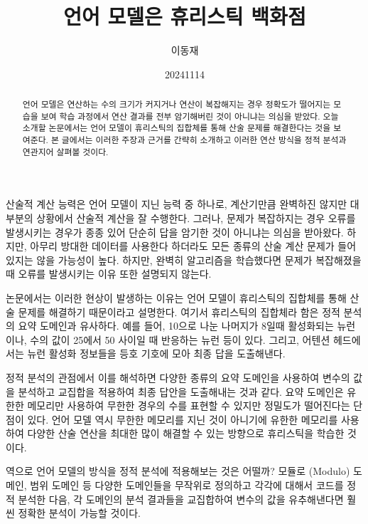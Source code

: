 \documentclass[11pt, oneside]{article}   	%
\title{언어 모델은 휴리스틱 백화점}
\author{이동재}
\date{20241114}
\begin{document}
\maketitle


\begin{abstract}
  언어 모델은 연산하는 수의 크기가 커지거나 연산이 복잡해지는 경우 정확도가 떨어지는 모습을 보여 학습 과정에서 연산 결과를 전부 암기해버린 것이 아니냐는 의심을 받았다. 오늘 소개할 논문에서는 언어 모델이 휴리스틱의 집합체를 통해 산술 문제를 해결한다는 것을 보여준다. 본 글에서는 이러한 주장과 근거를 간략히 소개하고 이러한 연산 방식을 정적 분석과 연관지어 살펴볼 것이다.
\end{abstract}
  산술적 계산 능력은 언어 모델이 지닌 능력 중 하나로, 계산기만큼 완벽하진 않지만 대부분의 상황에서 산술적 계산을 잘 수행한다. 그러나, 문제가 복잡하지는 경우 오류를 발생시키는 경우가 종종 있어 단순히 답을 암기한 것이 아니냐는 의심을 받아왔다. 하지만, 아무리 방대한 데이터를 사용한다 하더라도 모든 종류의 산술 계산 문제가 들어있지는 않을 가능성이 높다. 하지만, 완벽히 알고리즘을 학습했다면 문제가 복잡해졌을 때 오류를 발생시키는 이유 또한 설명되지 않는다.

  논문에서는 이러한 현상이 발생하는 이유는 언어 모델이 휴리스틱의 집합체를 통해 산술 문제를 해결하기 때문이라고 설명한다. 여기서 휴리스틱의 집합체라 함은 정적 분석의 요약 도메인과 유사하다. 예를 들어, 10으로 나눈 나머지가 8일때 활성화되는 뉴런이나, 수의 값이 25에서 50 사이일 때 반응하는 뉴런 등이 있다. 그리고, 어텐션 헤드에서는 뉴런 활성화 정보들을 등호 기호에 모아 최종 답을 도출해낸다.

  정적 분석의 관점에서 이를 해석하면 다양한 종류의 요약 도메인을 사용하여 변수의 값을 분석하고 교집합을 적용하여 최종 답안을 도출해내는 것과 같다. 요약 도메인은 유한한 메모리만 사용하여 무한한 경우의 수를 표현할 수 있지만 정밀도가 떨어진다는 단점이 있다. 언어 모델 역시 무한한 메모리를 지닌 것이 아니기에 유한한 메모리를 사용하여 다양한 산술 연산을 최대한 많이 해결할 수 있는 방향으로 휴리스틱을 학습한 것이다.

  역으로 언어 모델의 방식을 정적 분석에 적용해보는 것은 어떨까? 모듈로 (Modulo) 도메인, 범위 도메인 등 다양한 도메인들을 무작위로 정의하고 각각에 대해서 코드를 정적 분석한 다음, 각 도메인의 분석 결과들을 교집합하여 변수의 값을 유추해낸다면 훨씬 정확한 분석이 가능할 것이다.
\end{document}
